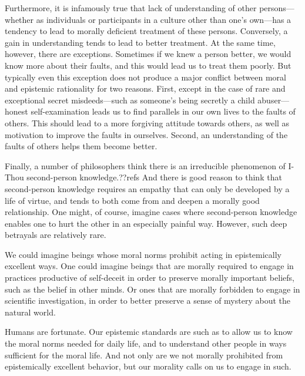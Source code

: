 Furthermore, it is infamously true that lack of understanding of other persons---whether as individuals or participants in 
a culture other than one's own---has a tendency to lead to morally deficient treatment of these persons. Conversely, a 
gain in understanding tends to lead to better treatment. At the same time, however, there are exceptions. Sometimes if we 
knew a person better, we would know more about their faults, and this would lead us to treat them poorly. But typically 
even this exception does not produce a major conflict between moral and epistemic rationality for two reasons. First, 
except in the case of rare and exceptional secret misdeeds---such as someone's being secretly a child 
abuser---honest self-examination leads us to find parallels in 
our own lives to the faults of others. This should lead to a more forgiving attitude towards others, as well as motivation
to improve the faults in ourselves. Second, an understanding of the faults of others helps them 
become better.

Finally, a number of philosophers think there is an irreducible phenomenon of I-Thou second-person knowledge.??refs And there is good
reason to think that second-person knowledge requires an empathy that can only be developed by a life of virtue, and 
tends to both come from and deepen a morally good relationship. One might, of course, imagine cases where second-person 
knowledge enables one to hurt the other in an especially painful way. However, such deep betrayals are relatively rare.

We could imagine beings whose moral norms prohibit acting in epistemically excellent ways. One could imagine
beings that are morally required to engage in practices productive of self-deceit in order to preserve morally important
beliefs, such as the belief in other minds. Or ones that are morally forbidden to engage in scientific investigation,
in order to better preserve a sense of mystery about the natural world.

Humans are fortunate. Our epistemic standards are such as to allow us to know the moral norms needed for daily life, 
and to understand other people in ways sufficient for the moral life. And not only are we not morally prohibited from 
epistemically excellent behavior, but our morality calls on us to engage in such.

